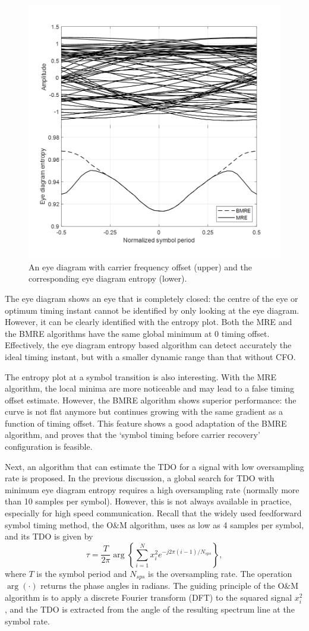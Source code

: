 \documentclass[journal,comsoc]{IEEEtran}
\begin{document}
\begin{figure}[ht]
\centering
\includegraphics[width=3 in]{pic/timing_freq.png}
\caption{An eye diagram with carrier frequency offset (upper) and the corresponding eye diagram entropy (lower).}
\label{fig:timing_freq} 
\end{figure}

The eye diagram shows an eye that is completely closed: the centre of the eye or optimum timing instant cannot be identified by only looking at the eye diagram.
However, it can be clearly identified with the entropy plot.
Both the MRE and the BMRE algorithms have the same global minimum at 0 timing offset. 
Effectively, the eye diagram entropy based algorithm can detect accurately the ideal timing instant,
but with a smaller dynamic range than that without CFO.

The entropy plot at a symbol transition is also interesting.
With the MRE algorithm, the local minima are more noticeable and may lead to a false timing offset estimate.
However, the BMRE algorithm shows superior performance:
the curve is not flat anymore but continues growing with the same gradient as a function of timing offset.
This feature shows a good adaptation of the BMRE algorithm, and proves that the `symbol timing before carrier recovery' configuration is feasible.


Next, an algorithm that can estimate the TDO for a signal with low oversampling rate is proposed.
In the previous discussion, a global search for TDO with minimum eye diagram entropy requires a high oversampling rate (normally more than 10 samples per symbol).
However, this is not always available in practice, especially for high speed communication.
Recall that the widely used feedforward symbol timing method, the O\&M algorithm, uses as low as 4 samples per symbol, and its TDO is given by
\begin{equation}
\tau=\frac{T}{2\pi}\arg \left\{ {\sum\limits_{i = 1}^{N} {x_i^2{e^{ - j2\pi (i-1)/N_{sps}}}} } \right\},
\label{eq:om}
\end{equation}
where \(T\) is the symbol period and \(N_{sps}\) is the oversampling rate.
The operation \(\arg( \cdot )\) returns the phase angles in radians.
The guiding principle of the O\&M algorithm is to apply a discrete Fourier transform (DFT) to the squared signal \(x_i^2\),
and the TDO is extracted from the angle of the resulting spectrum line at the symbol rate.
\end{document}
